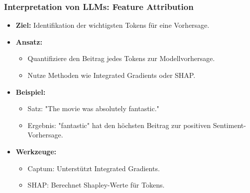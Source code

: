 \documentclass[aspectratio=1610, xcolor=dvipsnames, 9pt]{beamer}
\begin{document}
\begin{frame}
  \frametitle{Interpretation von LLMs: Feature Attribution}
  \begin{itemize}
    \item \textbf{Ziel:} Identifikation der wichtigsten Tokens für eine Vorhersage.
    \item \textbf{Ansatz:}
    \begin{itemize}
      \item Quantifiziere den Beitrag jedes Tokens zur Modellvorhersage.
      \item Nutze Methoden wie Integrated Gradients oder SHAP.
    \end{itemize}
    \item \textbf{Beispiel:}
    \begin{itemize}
      \item Satz: "The movie was absolutely fantastic."
      \item Ergebnis: "fantastic" hat den höchsten Beitrag zur positiven Sentiment-Vorhersage.
    \end{itemize}
    \item \textbf{Werkzeuge:}
    \begin{itemize}
      \item Captum: Unterstützt Integrated Gradients.
      \item SHAP: Berechnet Shapley-Werte für Tokens.
    \end{itemize}
  \end{itemize}
\end{frame}
\end{document}
